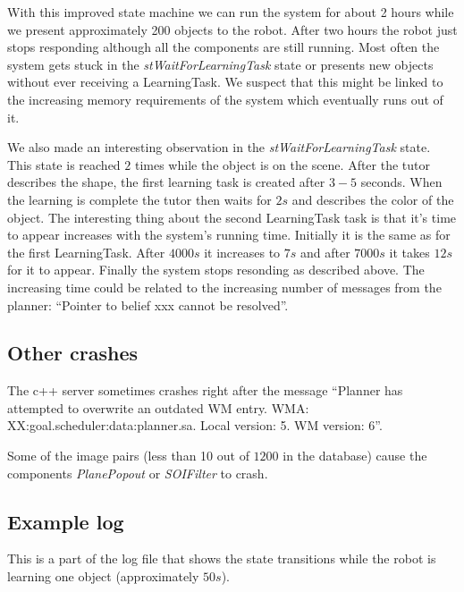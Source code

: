 \documentclass{article}
\begin{document}
With this improved state machine we can run the system for about 2 hours while
we present approximately 200 objects to the robot. After two hours the robot
just stops responding although all the components are still running. Most often
the system gets stuck in the {\em stWaitForLearningTask} state or presents new
objects without ever receiving a LearningTask.  We suspect that this might be
linked to the increasing memory requirements of the system which eventually
runs out of it.

We also made an interesting observation in the {\em stWaitForLearningTask}
state. This state is reached $2$ times while the object is on the scene. After
the tutor describes the shape, the first learning task is created after $3-5$
seconds. When the learning is complete the tutor then waits for $2s$ and
describes the color of the object.  The interesting thing about the second
LearningTask task is that it's time to appear increases with the system's
running time. Initially it is the same as for the first LearningTask. After
$4000s$ it increases to $7s$ and after $7000s$ it takes $12s$ for it to appear.
Finally the system stops resonding as described above.  The increasing time
could be related to the increasing number of messages from the planner:
``Pointer to belief xxx cannot be resolved''.

\subsection{Other crashes}

The c++ server sometimes crashes right after the message ``Planner has
attempted to overwrite an outdated WM entry. WMA:
XX:goal.scheduler:data:planner.sa.  Local version: 5.  WM version: 6''.

Some of the image pairs (less than 10 out of $1200$ in the database) cause the
components {\em PlanePopout} or {\em SOIFilter} to crash.

\subsection{Example log}

This is a part of the log file that shows the state transitions while the robot
is learning one object (approximately $50s$).
\end{document}
